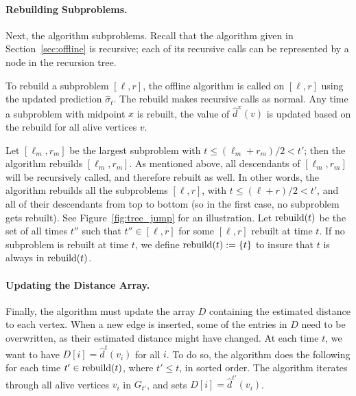 \paragraph{Rebuilding Subproblems.} 
Next, the algorithm  subproblems.  Recall that the algorithm given in Section~\ref{sec:offline} is recursive; each of its recursive calls can be represented by a node in the recursion tree. 

To rebuild a subproblem $[\ell, r]$, the offline algorithm is called on $[\ell, r]$ using the updated prediction $\hat{\sigma}_t$.  The rebuild makes recursive calls as normal.
Any time a subproblem with midpoint $x$ is rebuilt, the value of $\hat{d}^{x}(v)$ is updated based on the rebuild for all alive vertices $v$.  

Let $[\ell_m, r_m]$ be the largest subproblem with $t \leq (\ell_m+r_m)/2 < t'$; then the algorithm rebuilds $[\ell_m, r_m]$. As mentioned above, all descendants of $[\ell_m, r_m]$ will be recursively called, and therefore rebuilt as well.  
In other words, the algorithm rebuilds all the subproblems $[\ell, r]$, with $t \leq (\ell+r)/2 < t'$, and all of their descendants from top to bottom (so in the first case, no subproblem gets rebuilt). 
See Figure~\ref{fig:tree_jump} for an illustration. 
Let $\text{rebuild}(t)$ be the set of all times $t''$ such that $t''\in [\ell, r]$ for some $[\ell, r]$ rebuilt at time $t$. If no subproblem is rebuilt at time $t$, we define $\text{rebuild}(t) := \{t\}$ to insure that $t$ is always in $\text{rebuild}(t)$. 

\paragraph{Updating the Distance Array.}
Finally, the algorithm must update the array $D$ containing the estimated distance to each vertex. 
When a new edge is inserted, some of the entries in $D$ need to be overwritten, as their estimated distance might have changed. 
At each time $t$, we want to have $D[i] = \hat{d}^t(v_i)$ for all $i$. 
To do so, the algorithm does the following for each time $t' \in \text{rebuild}(t)$, where $t' \leq t$, in sorted order. The algorithm iterates through all alive vertices $v_i$ in $G_{t'}$, and sets $D[i] = \hat{d}^{t'}(v_i)$. 

